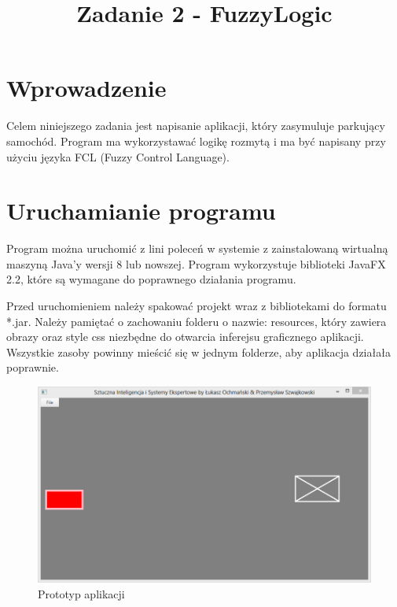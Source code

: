 \documentclass{classrep}
\author{
  \studentinfo{Łukasz Ochmański}{183566} \and
  \studentinfo{Przemysław Szwajkowski}{173524}
}
\title{Zadanie 2 - FuzzyLogic}
\begin{document}
\maketitle


\section{Wprowadzenie}
Celem niniejszego zadania jest napisanie aplikacji, który zasymuluje parkujący samochód. Program ma wykorzystawać logikę rozmytą i ma być napisany przy użyciu języka FCL (Fuzzy Control Language).

\section{Uruchamianie programu}
Program można uruchomić z lini poleceń w systemie z zainstalowaną wirtualną maszyną Java'y wersji 8 lub nowszej. Program wykorzystuje biblioteki JavaFX 2.2, które są wymagane do poprawnego działania programu.

Przed uruchomieniem należy spakować projekt wraz z bibliotekami do formatu *.jar. Należy pamiętać o zachowaniu folderu o nazwie: resources, który zawiera obrazy oraz style css niezbędne do otwarcia inferejsu graficznego aplikacji. Wszystkie zasoby powinny mieścić się w jednym folderze, aby aplikacja działała poprawnie.

\begin{figure}[ht]
\centering
			\includegraphics[scale=0.60]{pictures/Obraz01.png}
	\caption{Prototyp aplikacji}
	\label{fig:Prototyp aplikacji}
\end{figure}
\end{document}
